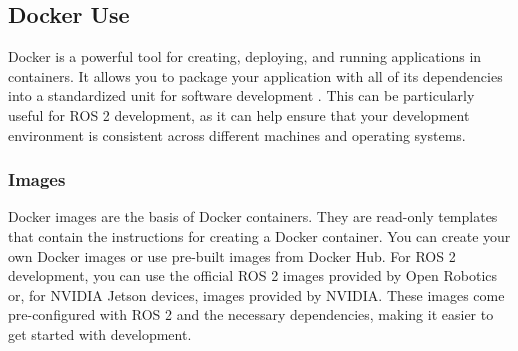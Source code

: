 %
%
%
%

\subsection{Docker Use}
\label{sec:docker-setup}

Docker is a powerful tool for creating, deploying, and running applications in containers. It allows you to package your application with all of its dependencies into a standardized unit for software development \autocite{ABOUTDOCKER}.
This can be particularly useful for ROS 2 development, as it can help ensure that your development environment is consistent across different machines and operating systems.



\bigskip
\subsubsection{Images}

Docker images are the basis of Docker containers. They are read-only templates that contain the instructions for creating a Docker container. You can create your own Docker images or use pre-built images from Docker Hub. For ROS 2 development, you can use the official ROS 2 images provided by Open Robotics or, for NVIDIA Jetson devices, images provided by NVIDIA. These images come pre-configured with ROS 2 and the necessary dependencies, making it easier to get started with development.

